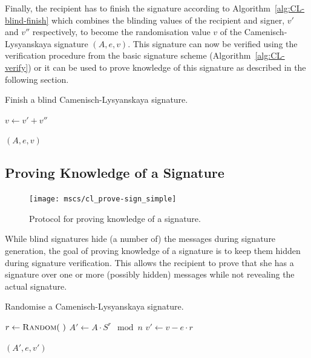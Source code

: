 Finally, the recipient has to finish the signature according to
Algorithm~\ref{alg:CL-blind-finish} which combines the blinding values of the
recipient and signer, $v'$ and $v''$ respectively, to become the randomisation
value $v$ of the Camenisch-Lysyanskaya signature $(A, e, v)$. This signature can
now be verified using the verification procedure from the basic signature scheme
(Algorithm~\ref{alg:CL-verify}) or it can be used to prove knowledge of this
signature as described in the following section.

\begin{algorithm}
  \caption{Finish a blind Camenisch-Lysyanskaya signature.}
  \label{alg:CL-blind-finish}
  \addtolength{\baselineskip}{1mm}
  \begin{algorithmic}[1]
      \State $v \gets v' + v''$

      \Return $(A, e, v)$
    \EndFunction
  \end{algorithmic}
\end{algorithm}

\subsection{Proving Knowledge of a Signature}\label{sec:cl_proof}

\begin{figure}[ht]
  \centering
  \texttt{[image: mscs/cl\_prove-sign\_simple]}
  \caption{Protocol for proving knowledge of a signature.}
  \label{msc:cl_prove-sign}
\end{figure}

While blind signatures hide (a number of) the messages during signature
generation, the goal of proving knowledge of a signature is to keep them hidden
during signature verification. This allows the recipient to prove that she has a
signature over one or more (possibly hidden) messages while not revealing the
actual signature.

\begin{algorithm}
  \caption{Randomise a Camenisch-Lysyanskaya signature.}
  \label{alg:CL-randomise}
  \addtolength{\baselineskip}{1mm}
  \begin{algorithmic}[1]
      \State $r \gets \Call{Random}{~}$
      \State $A' \gets A \cdot S^r \mod n$
      \State $v' \gets v - e \cdot r$

      \Return $(A', e, v')$
    \EndFunction
  \end{algorithmic}
\end{algorithm}

